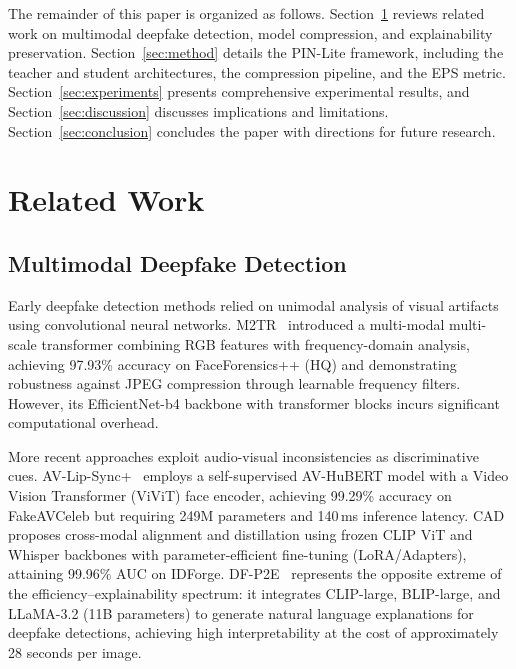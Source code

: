 \documentclass[lettersize,journal]{IEEEtran}
\begin{document}
The remainder of this paper is organized as follows. Section~\ref{sec:related} reviews related work on multimodal deepfake detection, model compression, and explainability preservation. Section~\ref{sec:method} details the PIN-Lite framework, including the teacher and student architectures, the compression pipeline, and the EPS metric. Section~\ref{sec:experiments} presents comprehensive experimental results, and Section~\ref{sec:discussion} discusses implications and limitations. Section~\ref{sec:conclusion} concludes the paper with directions for future research.


\section{Related Work}
\label{sec:related}

\subsection{Multimodal Deepfake Detection}

Early deepfake detection methods relied on unimodal analysis of visual artifacts using convolutional neural networks. M2TR~\cite{wang2022m2tr} introduced a multi-modal multi-scale transformer combining RGB features with frequency-domain analysis, achieving 97.93\% accuracy on FaceForensics++ (HQ) and demonstrating robustness against JPEG compression through learnable frequency filters. However, its EfficientNet-b4 backbone with transformer blocks incurs significant computational overhead.

More recent approaches exploit audio-visual inconsistencies as discriminative cues. AV-Lip-Sync+~\cite{shahzad2025avlipsync} employs a self-supervised AV-HuBERT model with a Video Vision Transformer (ViViT) face encoder, achieving 99.29\% accuracy on FakeAVCeleb but requiring 249M parameters and 140\,ms inference latency. CAD~\cite{du2025cad} proposes cross-modal alignment and distillation using frozen CLIP ViT and Whisper backbones with parameter-efficient fine-tuning (LoRA/Adapters), attaining 99.96\% AUC on IDForge. DF-P2E~\cite{tariq2025dfp2e} represents the opposite extreme of the efficiency--explainability spectrum: it integrates CLIP-large, BLIP-large, and LLaMA-3.2 (11B parameters) to generate natural language explanations for deepfake detections, achieving high interpretability at the cost of approximately 28 seconds per image.
\end{document}
